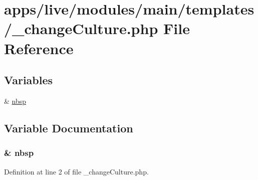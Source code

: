 \hypertarget{live_2modules_2main_2templates_2__change_culture_8php}{\section{apps/live/modules/main/templates/\-\_\-change\-Culture.php File Reference}
\label{live_2modules_2main_2templates_2__change_culture_8php}
}
\subsection*{Variables}
\begin{DoxyCompactItemize}
\item 
\& \hyperlink{live_2modules_2main_2templates_2__change_culture_8php_aef915316f784c9063d942974538301a6}{nbsp}
\end{DoxyCompactItemize}


\subsection{Variable Documentation}
\hypertarget{live_2modules_2main_2templates_2__change_culture_8php_aef915316f784c9063d942974538301a6}{
\subsubsection[{nbsp}]{\setlength{\rightskip}{0pt plus 5cm}\& nbsp}}\label{live_2modules_2main_2templates_2__change_culture_8php_aef915316f784c9063d942974538301a6}


Definition at line 2 of file \-\_\-change\-Culture.\-php.

